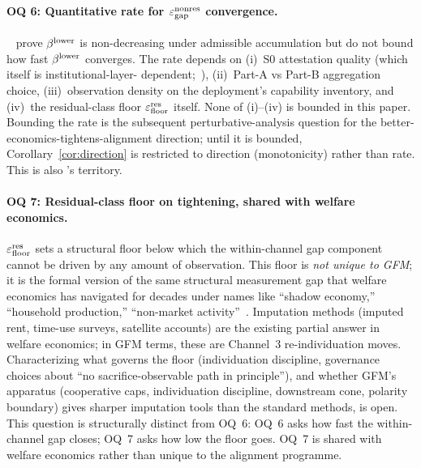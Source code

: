 \paragraph{OQ 6: Quantitative rate for $\varepsilon_{\mathrm{gap}}^{\mathrm{nonres}}$
convergence.}
\label{oq:rate}
~\citep[Propositions~2~and~3]{lasser2026paper8a} prove
$\beta^{\mathrm{lower}}$ is non-decreasing under admissible accumulation but
do not bound how fast $\beta^{\mathrm{lower}}$ converges.  The rate depends on
(i)~S0 attestation quality (which itself is institutional-layer-
dependent;~\citep[Remark~18]{lasser2026paper8a}),
(ii)~Part-A vs Part-B aggregation choice,
(iii)~observation density on the deployment's capability
inventory, and (iv)~the residual-class floor $\varepsilon_{\mathrm{floor}}^{\mathrm{res}}$
itself.  None of (i)--(iv) is bounded in this paper.
Bounding the rate is the subsequent perturbative-analysis
question for the better-economics-tightens-alignment
direction; until it is bounded, Corollary~\ref{cor:direction}
is restricted to direction (monotonicity) rather than rate.
This is also \citep[Open~Question~6]{lasser2026paper8b}'s
territory.

\paragraph{OQ 7: Residual-class floor on tightening, shared with
welfare economics.}
\label{oq:floor}
$\varepsilon_{\mathrm{floor}}^{\mathrm{res}}$ sets a structural floor below which the
within-channel gap component cannot be driven by any amount of
observation.  This floor is \emph{not unique to GFM}; it is
the formal version of the same structural measurement gap that
welfare economics has navigated for decades under names like
``shadow economy,'' ``household production,''
``non-market activity''~\citep{stiglitz2009report}.  Imputation
methods (imputed rent, time-use surveys, satellite accounts)
are the existing partial answer in welfare economics; in GFM
terms, these are Channel~3 re-individuation moves.
Characterizing what governs the floor (individuation
discipline, governance choices about ``no sacrifice-observable
path in principle''), and whether GFM's apparatus (cooperative
caps, individuation discipline, downstream cone, polarity
boundary) gives sharper imputation tools than the standard
methods, is open.  This question is structurally distinct from
OQ~6: OQ~6 asks how fast the within-channel gap closes; OQ~7
asks how low the floor goes.  OQ~7 is shared with welfare
economics rather than unique to the alignment programme.

